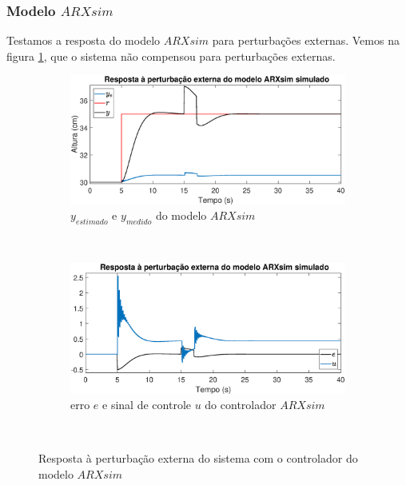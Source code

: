 \subsubsection{Modelo $ARXsim$}

Testamos a resposta do modelo $ARXsim$ para perturbações externas. Vemos na figura \ref{fig:pextsarxsimy}, que o sistema não compensou para perturbações externas.

\begin{figure}[htb]
	\centering
	\begin{subfigure}[t]{0.48\textwidth}
		\includegraphics[width=1\linewidth]{pasta1_figuras/pextsarxsimy}
		\caption[$y_{estimado}$ e $y_{medido}$ do modelo $ARX2$]{$y_{estimado}$ e $y_{medido}$ do modelo $ARXsim$}
		\label{fig:pextsarxsimy}
	\end{subfigure}
	~ %
	\begin{subfigure}[t]{0.48\textwidth}
		\includegraphics[width=1\linewidth]{pasta1_figuras/pextsarxsime}
		\caption[erro $e$ e sinal de controle $u$ do controlador $ARX2$]{erro $e$ e sinal de controle $u$ do controlador $ARXsim$}
		\label{fig:pextsarxsime}
	\end{subfigure}
	~ %
	
	\caption{Resposta à perturbação externa do sistema com o controlador do modelo $ARXsim$}\label{fig:pextsarxsim}
\end{figure}




